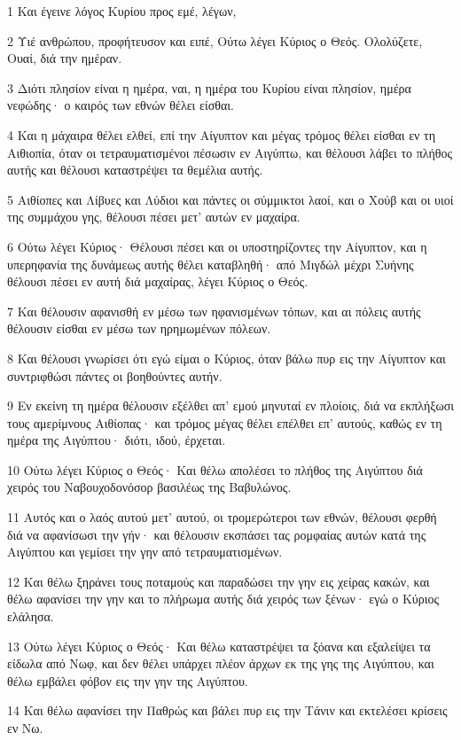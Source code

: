 \par 1 Και έγεινε λόγος Κυρίου προς εμέ, λέγων,
\par 2 Υιέ ανθρώπου, προφήτευσον και ειπέ, Ούτω λέγει Κύριος ο Θεός. Ολολύζετε, Ουαί, διά την ημέραν.
\par 3 Διότι πλησίον είναι η ημέρα, ναι, η ημέρα του Κυρίου είναι πλησίον, ημέρα νεφώδης· ο καιρός των εθνών θέλει είσθαι.
\par 4 Και η μάχαιρα θέλει ελθεί, επί την Αίγυπτον και μέγας τρόμος θέλει είσθαι εν τη Αιθιοπία, όταν οι τετραυματισμένοι πέσωσιν εν Αιγύπτω, και θέλουσι λάβει το πλήθος αυτής και θέλουσι καταστρέψει τα θεμέλια αυτής.
\par 5 Αιθίοπες και Λίβυες και Λύδιοι και πάντες οι σύμμικτοι λαοί, και ο Χούβ και οι υιοί της συμμάχου γης, θέλουσι πέσει μετ' αυτών εν μαχαίρα.
\par 6 Ούτω λέγει Κύριος· Θέλουσι πέσει και οι υποστηρίζοντες την Αίγυπτον, και η υπερηφανία της δυνάμεως αυτής θέλει καταβληθή· από Μιγδώλ μέχρι Συήνης θέλουσι πέσει εν αυτή διά μαχαίρας, λέγει Κύριος ο Θεός.
\par 7 Και θέλουσιν αφανισθή εν μέσω των ηφανισμένων τόπων, και αι πόλεις αυτής θέλουσιν είσθαι εν μέσω των ηρημωμένων πόλεων.
\par 8 Και θέλουσι γνωρίσει ότι εγώ είμαι ο Κύριος, όταν βάλω πυρ εις την Αίγυπτον και συντριφθώσι πάντες οι βοηθούντες αυτήν.
\par 9 Εν εκείνη τη ημέρα θέλουσιν εξέλθει απ' εμού μηνυταί εν πλοίοις, διά να εκπλήξωσι τους αμερίμνους Αιθίοπας· και τρόμος μέγας θέλει επέλθει επ' αυτούς, καθώς εν τη ημέρα της Αιγύπτου· διότι, ιδού, έρχεται.
\par 10 Ούτω λέγει Κύριος ο Θεός· Και θέλω απολέσει το πλήθος της Αιγύπτου διά χειρός του Ναβουχοδονόσορ βασιλέως της Βαβυλώνος.
\par 11 Αυτός και ο λαός αυτού μετ' αυτού, οι τρομερώτεροι των εθνών, θέλουσι φερθή διά να αφανίσωσι την γήν· και θέλουσιν εκσπάσει τας ρομφαίας αυτών κατά της Αιγύπτου και γεμίσει την γην από τετραυματισμένων.
\par 12 Και θέλω ξηράνει τους ποταμούς και παραδώσει την γην εις χείρας κακών, και θέλω αφανίσει την γην και το πλήρωμα αυτής διά χειρός των ξένων· εγώ ο Κύριος ελάλησα.
\par 13 Ούτω λέγει Κύριος ο Θεός· Και θέλω καταστρέψει τα ξόανα και εξαλείψει τα είδωλα από Νωφ, και δεν θέλει υπάρχει πλέον άρχων εκ της γης της Αιγύπτου, και θέλω εμβάλει φόβον εις την γην της Αιγύπτου.
\par 14 Και θέλω αφανίσει την Παθρώς και βάλει πυρ εις την Τάνιν και εκτελέσει κρίσεις εν Νω.
